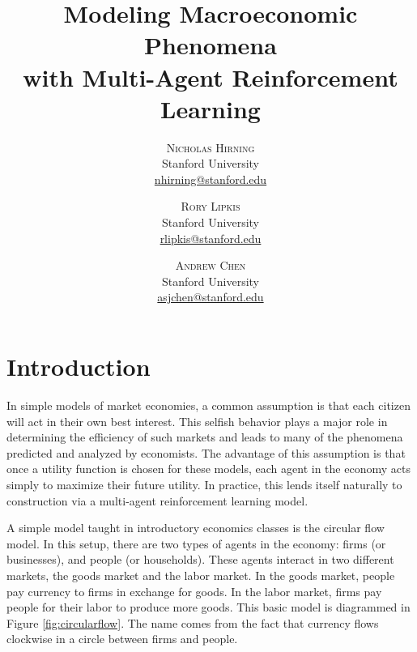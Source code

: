 \documentclass[twoside,twocolumn]{article}
\title{Modeling Macroeconomic Phenomena \\with Multi-Agent Reinforcement Learning} %
\author{%
\textsc{Nicholas Hirning} \\[1ex]
\normalsize Stanford University \\ 
\normalsize \href{mailto:nhirning@stanford.edu}{nhirning@stanford.edu}
\and
\textsc{Rory Lipkis} \\[1ex]
\normalsize Stanford University \\ 
\normalsize \href{mailto:rlipkis@stanford.edu}{rlipkis@stanford.edu}
\and
\textsc{Andrew Chen} \\[1ex]
\normalsize Stanford University \\ 
\normalsize \href{mailto:asjchen@stanford.edu}{asjchen@stanford.edu}
}
\date{} %
\begin{document}
\maketitle


\section{Introduction}

In simple models of market economies, a common assumption is that each citizen will act in their own best interest. This selfish behavior plays a major role in determining the efficiency of such markets and leads to many of the phenomena predicted and analyzed by economists. The advantage of this assumption is that once a utility function is chosen for these models, each agent in the economy acts simply to maximize their future utility. In practice, this lends itself naturally to construction via a multi-agent reinforcement learning model. 

\medskip

A simple model taught in introductory economics classes is the circular flow model. In this setup, there are two types of agents in the economy: firms (or businesses), and people (or households). These agents interact in two different markets, the goods market and the labor market. In the goods market, people pay currency to firms in exchange for goods. In the labor market, firms pay people for their labor to produce more goods. This basic model is diagrammed in Figure \ref{fig:circularflow}. The name comes from the fact that currency flows clockwise in a circle between firms and people.
\end{document}
